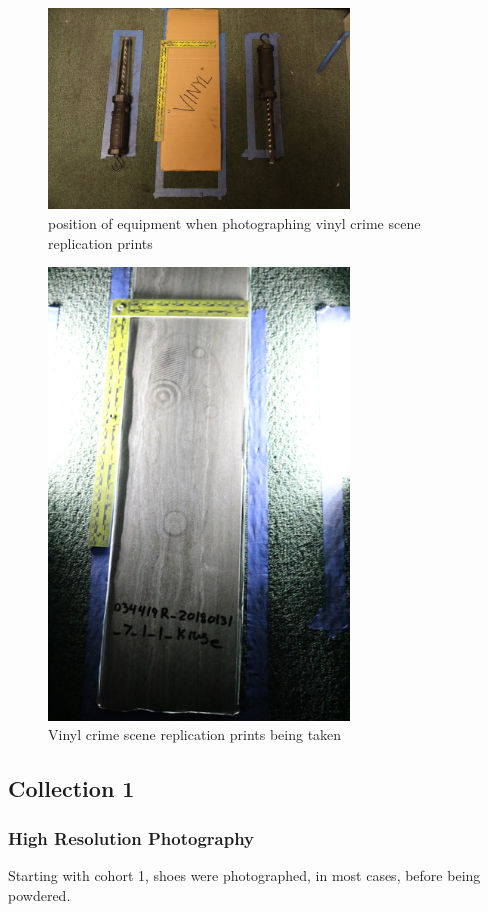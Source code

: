 \begin{figure}[!htp]
\centering
\includegraphics[width=8cm]{Baseline_Vinyl_set}
\caption{position of equipment when photographing vinyl crime scene replication prints}
\label{Image 22}
\end{figure}

\begin{figure}[!htp]
\centering
\includegraphics[width=8cm, angle=90]{Baseline_vinyl}
\caption{Vinyl crime scene replication prints being taken}
\label{Image 23}
\end{figure}

\newpage


\subsection{Collection 1}

\subsubsection{High Resolution Photography}
Starting with cohort 1, shoes were photographed, in most cases, before being powdered. 


